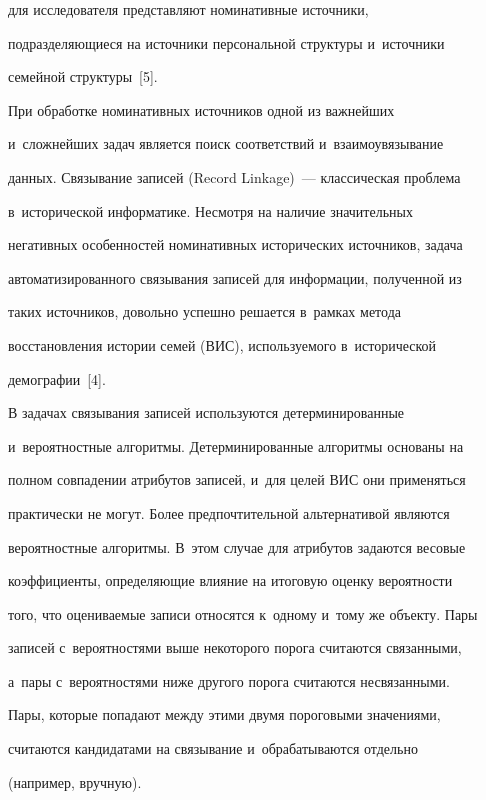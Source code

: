 для исследователя представляют номинативные источники, 


подразделяющиеся на источники персональной структуры и~источники 


семейной структуры~[5].


  


  При обработке номинативных источников одной из важнейших 


и~сложнейших задач является поиск соответствий и~взаимоувязывание 


данных. Связывание записей (Record Linkage)~--- классическая проблема 


в~исторической информатике. Несмотря на наличие значительных 


негативных особенностей номинативных исторических источников, задача 


автоматизированного связывания записей для информации, полученной из 


таких источников, довольно успешно решается в~рамках метода 


восстановления истории семей (ВИС), используемого в~исторической 


демографии~[4].


  


  В задачах связывания записей используются детерминированные 


и~вероятностные алгоритмы. Детерминированные алгоритмы основаны на 


полном совпадении атрибутов записей, и~для целей ВИС они применяться 


практически не могут. Более предпочтительной альтернативой являются 


вероятностные алгоритмы. В~этом случае для атрибутов задаются весовые 


коэффициенты, определяющие влияние на итоговую оценку вероятности 


того, что оцениваемые записи относятся к~одному и~тому же объекту. Пары 


записей с~вероятностями выше некоторого порога считаются связанными, 


а~пары с~вероятностями ниже другого порога считаются несвязанными. 


Пары, которые попадают между этими двумя пороговыми значениями, 


считаются кандидатами на связывание и~обрабатываются отдельно 


(например, вручную).


